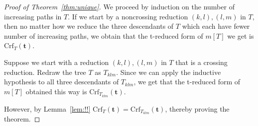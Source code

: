 \documentclass[10pt]{amsart}
\theoremstyle{definition}
\numberwithin{equation}{section}
\newcommand*{\Crf}{\mathrm{Crf}}
\newcommand*\+{\smash{\lower2pt\hbox{\rlap{\vrule height14pt}}\raise2pt\hbox{\rlap{\hskip-3pt \vrule height.4pt depth0pt width14.7pt}}}}
\begin{document}
\begin{proof}[Proof of Theorem~\ref{thm:unique}]
We proceed by induction on the number of increasing paths in $T$. If we start by a noncrossing reduction $(k,l), (l,m)$ in $T$, then no matter how we reduce the three descendants of $T$ which each have fewer number of increasing paths, we obtain that the t-reduced form of $m[T]$ we get is $\Crf_T(\mathbf{t})$.

Suppose we start with a reduction $(k,l), (l,m)$ in $T$ that is a crossing reduction. Redraw the tree $T$ as $T_{klm}$. Since we can apply the inductive hypothesis to all three descendants of $T_{klm}$, we get that the t-reduced form of $m[T]$ obtained this way is $\Crf_{T_{klm}}(\mathbf{t})$.

However, by Lemma~\ref{lem:!!} $\Crf_T(\mathbf{t})=\Crf_{T_{klm}}(\mathbf{t})$, thereby proving the theorem.
\end{proof}
\end{document}
